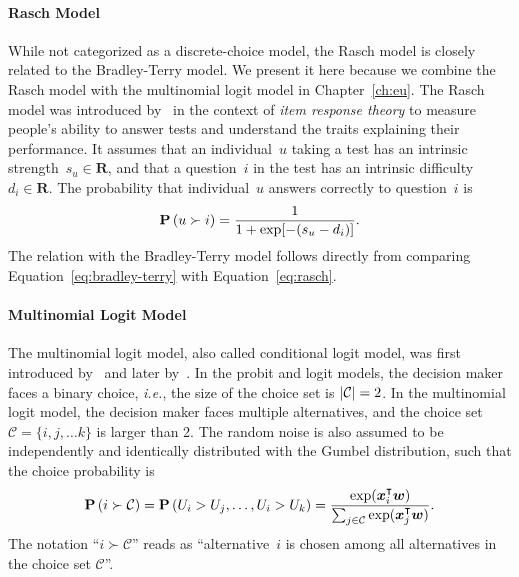 \paragraph{Rasch Model}
While not categorized as a discrete-choice model, the Rasch model is closely related to the Bradley-Terry model.
We present it here because we combine the Rasch model with the multinomial logit model in Chapter~\ref{ch:eu}.
The Rasch model was introduced by~\citet{rasch1993probabilistic} in the context of \emph{item response theory} to measure people's ability to answer tests and understand the traits explaining their performance.
It assumes that an individual~$u$ taking a test has an intrinsic strength~$s_u \in \mathbf{R}$, and that a question~$i$ in the test has an intrinsic difficulty~$d_i \in \mathbf{R}$.
The probability that individual~$u$ answers correctly to question~$i$ is
\begin{equation}
  \label{eq:rasch}
  \mathbf{P}\left( u \succ i \right) = \frac{1}{1 + \exp[-(s_u - d_i)]}.
\end{equation}
The relation with the Bradley-Terry model follows directly from comparing Equation~\ref{eq:bradley-terry} with Equation~\ref{eq:rasch}.

\paragraph{Multinomial Logit Model}

The multinomial logit model, also called conditional logit model, was first introduced by~\citet{luce1959individual} and later by~\citet{mcfadden1973conditional}.
In the probit and logit models, the decision maker faces a binary choice, \textit{i.e.}, the size of the choice set is $\lvert\mathcal{C}\rvert = 2$.
In the multinomial logit model, the decision maker faces multiple alternatives, and the choice set $\mathcal{C} = \{ i, j, \ldots k \}$ is larger than 2.
The random noise is also assumed to be independently and identically distributed with the Gumbel distribution, such that the choice probability is
\begin{equation}
  \label{eq:multinomiallogit}
  \mathbf{P}\left( i \succ \mathcal{C} \right) = \mathbf{P}\left( U_i > U_j, \ldots, U_i > U_k \right) = \frac{\exp(\bm{x}_i^\intercal \bm{w})}{\sum_{j \in \mathcal{C}} \exp(\bm{x}_j^\intercal \bm{w})}.
\end{equation}
The notation ``$i \succ \mathcal{C}$'' reads as ``alternative~$i$ is chosen among all alternatives in the choice set $\mathcal{C}$''.

